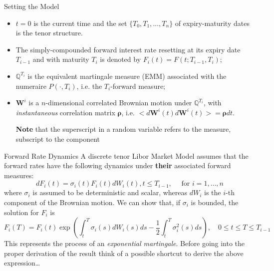 \documentclass{beamer}
\begin{document}
\begin{frame}{Setting the Model}
  \begin{itemize}
  \item<1-> $t = 0$ is the current time and the set $\{T_0, T_1, \dots, T_n\}$ of expiry-maturity dates is the tenor structure. %
  \item<2-> The simply-compounded forward interest rate resetting at its expiry date $T_{i-1}$ and with maturity $T_i$ is denoted by $F_i(t) = F(t; T_{i-1}, T_i)$;
  \item<3-> $\mathbb{Q}^{T_i}$ is the equivalent martingale measure (EMM) associated with the numeraire $P(\cdot, T_i)$, i.e. the $T_i$-forward measure;
  \item<4-> $\bm{W}^i$ is a $n$-dimensional \textcolor{maincolor}{correlated} Brownian motion under $\mathbb{Q}^{T_i}$, with \emph{instantaneous} correlation matrix $\bm{\rho}$, i.e. $< d\bm{W}^i(t) d\bm{W}^i(t)> = \bm{\rho} dt$.

  \textbf{Note} that the superscript in a random variable refers to the measure, subscript to the component
  \end{itemize}
\end{frame}

\begin{frame}{Forward Rate Dynamics}
	A discrete tenor Libor Market Model assumes that the forward rates have the following dynamics under \textbf{their} associated forward measures:
    \begin{equation}
      dF_i(t) = \sigma_i(t)F_i(t)dW_i(t), t \le T_{i-1},\quad\text{ for } i = 1,\ldots, n
      \label{eq:forward_process_lmm}
    \end{equation}
    where $\sigma_i$ is assumed to be deterministic and scalar, whereas $dW_i$ is the $i$-th component of the Brownian motion.
  	\pause
	We can show that, if $\sigma_i$ is bounded, the solution for $F_i$ is
	\begin{equation*}
	  F_i(T) = F_i(t) \exp\left(\int_t^T\sigma_i(s)dW_i(s)ds - \frac{1}{2}\int_t^T
	  \sigma_i^2(s)ds\right),\quad 0\le t \le T \le T_{i-1}
	\end{equation*}
	This represents the process of an \emph{exponential martingale}. Before going into the proper derivation of the result think of a possible shortcut to derive the above expression\ldots
\end{frame}
\end{document}
